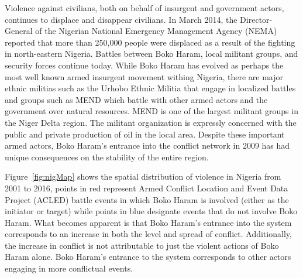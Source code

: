 Violence against civilians, both on behalf of insurgent and government actors, continues to displace and disappear civilians.  In March 2014, the Director-General of the Nigerian National Emergency Management Agency (NEMA) reported that more than 250,000 people were displaced as a result of the fighting in north-eastern Nigeria. Battles between Boko Haram, local militant groups, and security forces continue today. While Boko Haram has evolved as perhaps the most well known armed insurgent movement withing Nigeria, there are major ethnic militias such as the Urhobo Ethnic Militia that engage in localized battles and groups such as MEND which battle with other armed actors and the government over natural resources. MEND is one of the largest militant groups in the Niger Delta region. The militant organization is expressly concerned with the public and private production of oil in the local area. Despite these important armed actors, Boko Haram's entrance into the conflict network in 2009 has had unique consequences on the stability of the entire region.

Figure~\ref{fig:nigMap} shows the spatial distribution of violence in Nigeria from 2001 to 2016, points in red represent Armed Conflict Location and Event Data Project (ACLED) battle events in which Boko Haram is involved (either as the initiator or target) while points in blue designate events that do not involve Boko Haram. What becomes apparent is that Boko Haram's entrance into the system corresponds to an increase in both the level and spread of conflict. Additionally, the increase in conflict is not attributable to just the violent actions of Boko Haram alone. Boko Haram's entrance to the system corresponds to other actors engaging in more conflictual events. 
